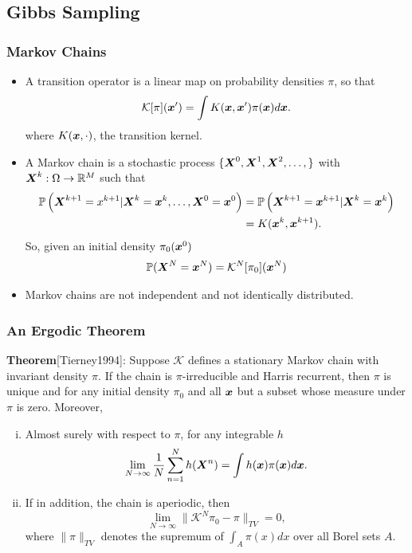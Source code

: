 \documentclass[]{beamer}
\newcommand{\R}{\ensuremath{\mathbb R}}  %
\newcommand{\PP}{\ensuremath{\mathbb P}}
\newcommand{\K}{\ensuremath{\mathcal K}}
\newcommand{\bm}[1]{\mbox{\boldmath$#1$}}
\newcommand{\vect}[1]{\bm{#1}}
\begin{document}
\subsection{Gibbs Sampling}
\begin{frame}[t]
  \frametitle{Markov Chains}
{\small
  \begin{itemize}
  \itemsep 1.2em
  \item A \alert{transition operator} is a linear map on probability densities $\pi$, so that
    $$
      \K [\pi](\vect x') = \int K(\vect x,\vect x') \pi(\vect x)d\vect x. 
    $$
  where $K(\vect x,\cdot)$, the \alert{transition kernel}.%

  \item A \alert{Markov chain} is a stochastic process $\{\vect X^0, \vect X^1,\vect X^2,\dots,\}$ with $\vect X^k:\Omega \to \R^M$ such that %
  \begin{align*}
  \mathbb P\left( \vect X^{k+1} = x^{k+1} | \vect X^k= \vect x^k,\dots,\vect X^0=\vect x^0\right) 
    &= \mathbb P\left( \vect X^{k+1} = \vect x^{k+1} | \vect X^k= \vect x^k\right) \\
    &= K(\vect x^k,\vect x^{k+1}).
  \end{align*}
  So, given an initial density $\pi_0({\vect x}^0)$
  $$
    \PP( \vect X^N = {\vect x}^N ) = \K^N[\pi_0]({\vect x}^N)
  $$
  \item Markov chains are \alert{not independent} and \alert{not identically distributed}. 
\end{itemize}
}
\end{frame}

\begin{frame}[t]
  \frametitle{An Ergodic Theorem}

  {\bf Theorem}[Tierney1994]: Suppose $\K$ defines a \alert{stationary} Markov chain with \alert{invariant} density $\pi$. If the chain is \alert{$\pi$-irreducible} and \alert{Harris recurrent}, then $\pi$ is unique and for any initial density $\pi_0$ and all $\vect x$ but a subset whose measure under $\pi$ is zero. Moreover,
  \begin{enumerate}[(i)]
    \item Almost surely with respect to $\pi$, for any integrable $h$ \begin{equation} \lim_{N\to \infty}\frac 1N\sum_{n=1}^N h(\vect X^n) = \int h(\vect x) \pi(\vect x) d\vect x. \label{eq:ergodicStat}\end{equation}
    \item If in addition, the chain is \alert{aperiodic}, then $$\lim_{N\to \infty}\|\K^N\pi_0 - \pi\|_{TV} = 0,$$ 
    where $\|\pi\|_{TV}$ denotes the supremum of $\int_A \pi(x) dx$ over all Borel sets $A$.
  \end{enumerate}
\end{frame}
\end{document}
